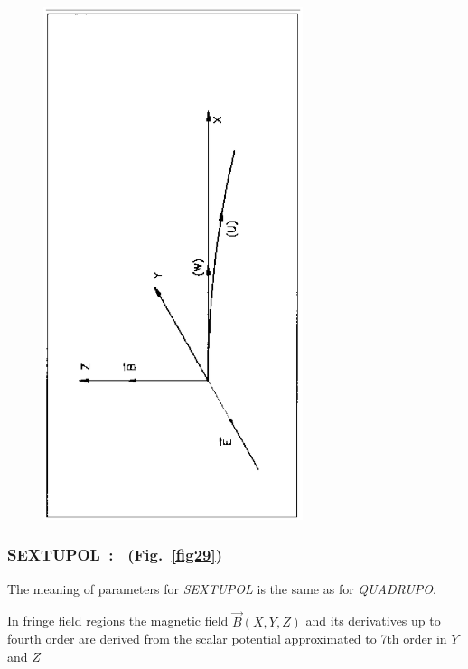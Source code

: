\vfill

\begin{figure}[H]
\centerline{\includegraphics[height=15cm,angle=-90]{Fig28.ps}}
{\setlength{\captionwidth}{14cm}
 }
\end{figure}
\vfill

\newpage

\subsubsection*{SEXTUPOL~: \SEXTUPOLTitl\ (Fig.~\protect\ref{fig29})} 
     \label{SEXTUPOL}   

The meaning of parameters for \textsl{SEXTUPOL} is the same as 
for \textsl{QUADRUPO}.  
\medskip

\noindent In fringe field regions the magnetic field $ \vec  B(X,Y,Z) $ and
its derivatives up to fourth order are derived from the scalar potential approximated to 
7th order in $ Y $ and $ Z $

